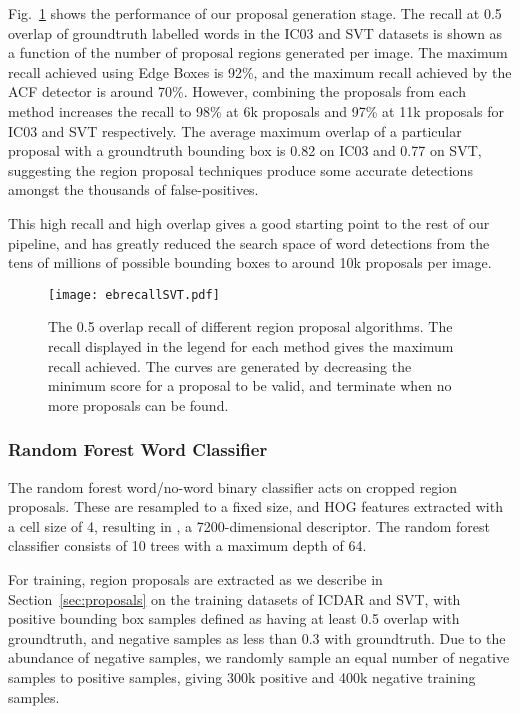 \documentclass[twocolumn]{svjour3}          \smartqed  \usepackage{epsfig}
\begin{document}
Fig.~\ref{fig:ebrecall} shows the performance of our proposal generation stage. The recall at 0.5 overlap of groundtruth labelled words in the IC03 and SVT datasets is shown as a function of the number of proposal regions generated per image. The maximum recall achieved using Edge Boxes is 92\%, and the maximum recall achieved by the ACF detector is around 70\%. However, combining the proposals from each method increases the recall to 98\% at 6k proposals and 97\% at 11k proposals for IC03 and SVT respectively. The average maximum overlap of a particular proposal with a groundtruth bounding box is 0.82 on IC03 and 0.77 on SVT, suggesting the region proposal techniques produce some accurate detections amongst the thousands of false-positives. 

This high recall and high overlap gives a good starting point to the rest of our pipeline, and has greatly reduced the search space of word detections from the tens of millions of possible bounding boxes to around 10k proposals per image.

\begin{figure}
\begin{center}
\texttt{[image: ebrecallSVT.pdf]} 
\caption{The 0.5 overlap recall of different region proposal algorithms. The recall displayed in the legend for each method gives the maximum recall achieved. The curves are generated by decreasing the minimum score for a proposal to be valid, and terminate when no more proposals can be found.}
\label{fig:ebrecall}
\end{center}
\end{figure}

\subsubsection{Random Forest Word Classifier}
The random forest word/no-word binary classifier acts on cropped region proposals. These are resampled to a fixed  size, and HOG features extracted with a cell size of 4, resulting in , a 7200-dimensional descriptor. The random forest classifier consists of 10 trees with a maximum depth of 64.

For training, region proposals are extracted as we describe in Section~\ref{sec:proposals} on the training datasets of ICDAR and SVT, with positive bounding box samples defined as having at least 0.5 overlap with groundtruth, and negative samples as less than 0.3 with groundtruth. Due to the abundance of negative samples, we randomly sample an equal number of negative samples to positive samples, giving 300k positive and 400k negative training samples.
\end{document}
